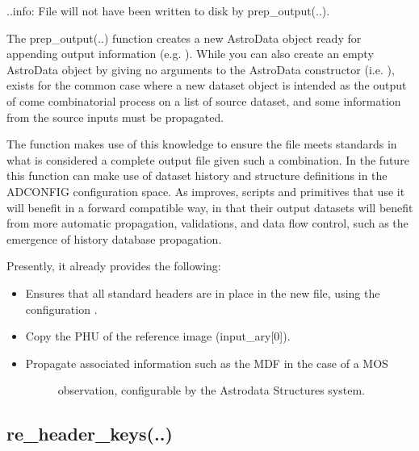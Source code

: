 \documentclass[letterpaper,10pt,english]{sphinxmanual}
\begin{document}
\begin{fulllineitems}
..info: File will not have been written to disk by prep\_output(..).

The prep\_output(..) function creates a new AstroData object ready for
appending output information (e.g. ).  While you can also
create an empty AstroData object by giving no arguments to the AstroData
constructor  (i.e. ),  exists for the
common case where a new dataset object is intended as the output of
come combinatorial process on a list of source dataset, and some information
from the source inputs must be propagated.

The  function makes use of this knowledge to ensure the
file meets standards in what is considered a complete output file given
such a combination.  In the future this function can make use of dataset
history and structure definitions in the ADCONFIG configuration space. As
 improves, scripts and primitives that use it
will benefit in a forward compatible way, in that their output datasets will
benefit from more automatic propagation, validations, and data flow control,
such as the emergence of history database propagation.

Presently, it already provides the following:
\begin{itemize}
\item {} 
Ensures that all standard headers  are in place in the new file, using the
configuration .

\item {} 
Copy the PHU of the reference image (input\_ary{[}0{]}).

\item {} \begin{description}
\item[{Propagate associated information such as the MDF in the case of a MOS }] \leavevmode
observation, configurable by the Astrodata Structures system.

\end{description}

\end{itemize}

\end{fulllineitems}



\subsection{re\_header\_keys(..)}
\label{chapter_AstroDataClass:re-header-keys}
\end{document}
